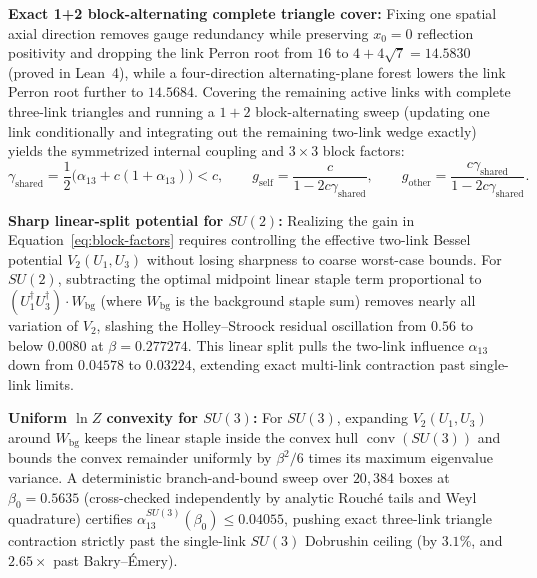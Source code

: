 \textbf{Exact 1+2 block-alternating complete triangle cover:} Fixing one spatial axial direction removes gauge
redundancy while preserving $x_0 = 0$ reflection positivity and dropping the link Perron root from $16$ to
$4 + 4\sqrt{7} = 14.5830$ (proved in Lean~4), while a four-direction alternating-plane forest lowers the link Perron
root further to $14.5684$. Covering the remaining active links with complete three-link triangles and running a $1 + 2$
block-alternating sweep (updating one link conditionally and integrating out the remaining two-link wedge exactly)
yields the symmetrized internal coupling and $3 \times 3$ block factors:
\begin{equation}
\gamma_{\mathrm{shared}} = \frac{1}{2}\bigl(\alpha_{13} + c(1 + \alpha_{13})\bigr) < c,
\qquad
g_{\mathrm{self}} = \frac{c}{1 - 2c\gamma_{\mathrm{shared}}},
\qquad
g_{\mathrm{other}} = \frac{c\gamma_{\mathrm{shared}}}{1 - 2c\gamma_{\mathrm{shared}}}.
\label{eq:block-factors}
\end{equation}

\textbf{Sharp linear-split potential for $SU(2)$:} Realizing the gain in Equation~\eqref{eq:block-factors} requires
controlling the effective two-link Bessel potential $V_2(U_1, U_3)$ without losing sharpness to coarse worst-case
bounds. For $SU(2)$, subtracting the optimal midpoint linear staple term proportional to $(U_1^\dagger U_3^\dagger)
\cdot W_{\mathrm{bg}}$ (where $W_{\mathrm{bg}}$ is the background staple sum) removes nearly all variation of $V_2$,
slashing the Holley--Stroock residual oscillation from $0.56$ to below $0.0080$ at $\beta = 0.277274$. This linear
split pulls the two-link influence $\alpha_{13}$ down from $0.04578$ to $0.03224$, extending exact multi-link
contraction past single-link limits.

\textbf{Uniform $\ln Z$ convexity for $SU(3)$:} For $SU(3)$, expanding $V_2(U_1, U_3)$ around $W_{\mathrm{bg}}$ keeps
the linear staple inside the convex hull $\operatorname{conv}(SU(3))$ and bounds the convex remainder uniformly by
$\beta^2 / 6$ times its maximum eigenvalue variance. A deterministic branch-and-bound sweep over $20{,}384$ boxes at
$\beta_0 = 0.5635$ (cross-checked independently by analytic Rouch\'e tails and Weyl quadrature) certifies
$\alpha_{13}^{SU(3)}(\beta_0) \le 0.04055$, pushing exact three-link triangle contraction strictly past the single-link
$SU(3)$ Dobrushin ceiling (by $3.1\%$, and $2.65\times$ past Bakry--\'Emery).

